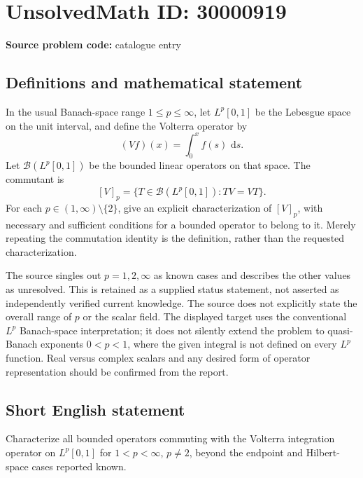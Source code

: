 \documentclass[11pt]{article}
\newcommand{\dd}{\,\mathrm{d}}
\begin{document}
\section*{UnsolvedMath ID: 30000919}
\textbf{Source problem code:} catalogue entry
\subsection{Definitions and mathematical statement}
In the usual Banach-space range \(1\leq p\leq\infty\), let \(L^p[0,1]\) be the Lebesgue space on the unit interval, and define the Volterra operator by
\[
(Vf)(x)=\int_0^x f(s)\,\dd s.
\]
Let \(\mathcal B(L^p[0,1])\) be the bounded linear operators on that space. The commutant is
\[
[V]_p=\{T\in\mathcal B(L^p[0,1]):TV=VT\}.
\]
For each \(p\in(1,\infty)\setminus\{2\}\), give an explicit characterization of \([V]_p\), with necessary and sufficient conditions for a bounded operator to belong to it. Merely repeating the commutation identity is the definition, rather than the requested characterization.

The source singles out \(p=1,2,\infty\) as known cases and describes the other values as unresolved. This is retained as a supplied status statement, not asserted as independently verified current knowledge. The source does not explicitly state the overall range of \(p\) or the scalar field. The displayed target uses the conventional \(L^p\) Banach-space interpretation; it does not silently extend the problem to quasi-Banach exponents \(0<p<1\), where the given integral is not defined on every \(L^p\) function. Real versus complex scalars and any desired form of operator representation should be confirmed from the report.
\subsection{Short English statement}
Characterize all bounded operators commuting with the Volterra integration operator on \(L^p[0,1]\) for \(1<p<\infty\), \(p\ne2\), beyond the endpoint and Hilbert-space cases reported known.
\end{document}
